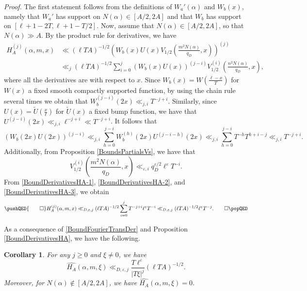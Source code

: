 \documentclass[11pt]{amsart}
\newtheorem{corollary}[theorem]{Corollary}
\theoremstyle{definition}
\theoremstyle{remark}
\begin{document}
\noindent \textit{Proof.} The first statement follows from the definitions of $W_{a}'(\alpha)$ and $W_{b}(x)$, namely that $W_{a}'$ has support on $N(\alpha) \in [A/2,2A]$ and that $W_{b}$ has support on $[\ell+1-2T,\ell+1-T/2]$. Now, assume that $N(\alpha) \in [A/2,2A]$, so that $N(\alpha) \gg A$. By the product rule for derivatives, we have
\begin{align}
    H_{A}^{(j)}(\alpha,m,x) &\ll (\ell TA)^{-1/2} \left( W_{b}(x) U(x) V_{1/2}\left( \frac{m^2 N(\alpha)}{q_D},x \right) \right)^{(j)} \label{BoundDerivativesHA-1} \\
    &\ll_{j} (\ell TA)^{-1/2} \sum_{i=0}^{j} \left(W_{b}(x) U(x)\right)^{(j-i)} V_{1/2}^{(i)}\left( \frac{n^2 N(\alpha)}{q_D},x \right), \nonumber
\end{align}
where all the derivatives are with respect to $x$. Since $W_{b}(x) = W\left(\frac{\ell-x}{T}\right)$ for $W(x)$ a fixed smooth compactly supported function, by using the chain rule several times we obtain that $W_{b}^{(j-i)}(2x) \ll_{j,i} T^{-j+i}$. Similarly, since $U(x) = \widetilde{U}\left(\frac{x}{\ell}\right)$ for $\widetilde{U}(x)$ a fixed bump function, we have that $U^{(j-i)}(2x) \ll_{j,i} \ell^{-j+i} \ll T^{-j+i}$. It follows that 
\begin{equation}
    \left(W_{b}(2x) U(2x) \right)^{(j-i)} \ll_{j,i} \sum_{h=0}^{j-i} W_{b}^{(h)}(2x) U^{(j-i-h)}(2x) \ll_{j,i} \sum_{h=0}^{j-i} T^{-h} T^{h+i-j} \ll_{j,i} T^{-j+i}. \label{BoundDerivativesHA-2}
\end{equation}
Additionally, from Proposition \ref{BoundsPartialsVs}, we have that
\begin{equation}
    V_{1/2}^{(i)}\left(\frac{m^2 N(\alpha)}{q_D},x\right) \ll_{\varepsilon,i} q_{D}^{\varepsilon/2} \ell^{\varepsilon} T^{-i}. \label{BoundDerivativesHA-3}
\end{equation}
From \eqref{BoundDerivativesHA-1}, \eqref{BoundDerivativesHA-2}, and \eqref{BoundDerivativesHA-3}, we obtain
\[
\pushQED{\qed}
H_{A}^{(j)}(\alpha,m,x) \ll_{D,\varepsilon,j} (\ell TA)^{-1/2} \sum_{i=0}^{j} T^{-j+i} \ell^{\varepsilon} T^{-i} \ll_{D,\varepsilon,j} (\ell TA)^{-1/2} \ell^{\varepsilon} T^{-j}. \qedhere
\popQED
\]

As a consequence of \eqref{BoundFourierTransDer} and Proposition \ref{BoundDerivativesHA}, we have the following.

\begin{corollary}\label{BoundHATransform}
For any $j\geq 0$ and $\xi\neq 0$, we have $$ \widehat{H_A}(\alpha,m,\xi) \ll_{D,\varepsilon,j} \frac{T \ell^{\varepsilon}}{|T\xi|^{j}} (\ell TA)^{-1/2}.$$ Moreover, for $N(\alpha) \notin [A/2,2A]$, we have $\widehat{H_A}(\alpha,m,\xi)=0$.
\end{corollary}
\end{document}
